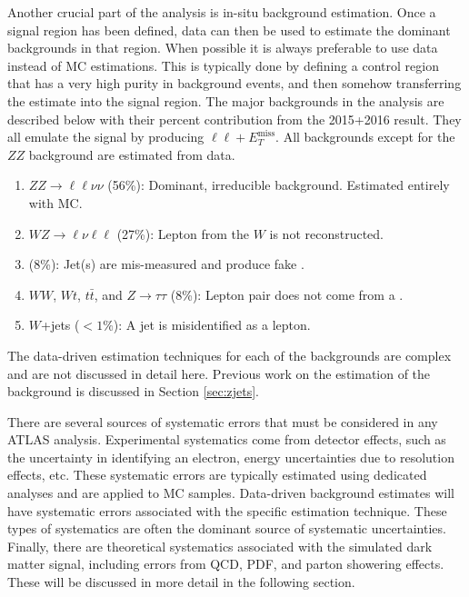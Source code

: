 Another crucial part of the analysis is in-situ background estimation. Once a signal region has been defined, data can then be used to estimate the dominant backgrounds in that region. When possible it is always preferable to use data instead of MC estimations. This is typically done by defining a control region that has a very high purity in background events, and then somehow transferring the estimate into the signal region. The major backgrounds in the analysis are described below with their percent contribution from the 2015+2016 result. They all emulate the signal by producing $\ell\ell+E_{T}^\text{miss}$. All backgrounds except for the $ZZ$ background are estimated from data.
\begin{enumerate}
	\item	 $ZZ \rightarrow \ell \ell \nu \nu$ (56\%): Dominant, irreducible background. Estimated entirely with MC. 
	\item	 $WZ \rightarrow \ell \nu \ell \ell$ (27\%): Lepton from the $W$ is not reconstructed. 
	\item \Zjets (8\%): Jet(s) are mis-measured and produce fake \etmiss. 
	\item $WW$, $Wt$, $t\bar{t}$, and $Z\rightarrow \tau \tau$ (8\%): Lepton pair does not come from a \Z.
	\item $W$+jets ($<1\%$): A jet is misidentified as a lepton.
\end{enumerate}

\noindent The data-driven estimation techniques for each of the backgrounds are complex and are not discussed in detail here. Previous work on the estimation of the \Zjets background is discussed in Section \ref{sec:zjets}.

There are several sources of systematic errors that must be considered in any ATLAS analysis. Experimental systematics come from detector effects, such as the uncertainty in identifying an electron, energy uncertainties due to resolution effects, etc. These systematic errors are typically estimated using dedicated analyses and are applied to MC samples. Data-driven background estimates will have systematic errors associated with the specific estimation technique. These types of systematics are often the dominant source of systematic uncertainties. Finally, there are theoretical systematics associated with the simulated dark matter signal, including errors from QCD, PDF, and parton showering effects. These will be discussed in more detail in the following section.

